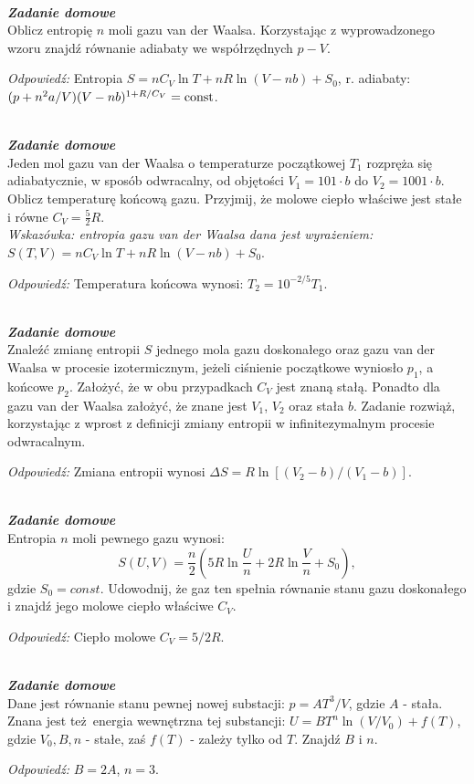 \documentclass[11pt,a4paper]{article}
\newcounter{zaddom}\newcommand{\zaddom}[1][]{\addtocounter{zaddom}{1} ~\\  {\bf \emph{Zadanie domowe \arabic{zaddom} #1 }} \\}
\begin{document}
\pagebreak
\zaddom
Oblicz entropię $n$ moli gazu van der Waalsa. Korzystając z wyprowadzonego
wzoru znajdź równanie adiabaty we współrzędnych $p - V$.

\vspace{5mm}
{\em Odpowiedź:} Entropia $S = n C_V \ln T + nR \ln (V - nb) + S_0$, r. adiabaty: $(p + n^2 a/ V)(V-nb)^{1+R/C_V} = {\rm const}$.


\zaddom
Jeden mol gazu van der Waalsa o temperaturze początkowej $T_1$ rozpręża się
adiabatycznie, w sposób odwracalny, od objętości $V_1 = 101\cdot b$ do
$V_2 = 1001\cdot b$. Oblicz temperaturę końcową gazu. Przyjmij, że
molowe ciepło właściwe jest stałe i równe $C_V=\frac{5}{2}R$.\\[3mm]
{\em Wskazówka: entropia gazu van der Waalsa dana jest wyrażeniem:\\
$\displaystyle S(T,V) = n C_V \ln{T} + n R \ln{(V-nb)} + S_0.$ }

\vspace{5mm}
{\em Odpowiedź:} Temperatura końcowa wynosi: $T_2 = 10^{-2/5} T_1$.  

\zaddom
Znaleźć zmianę entropii $S$ jednego mola gazu doskonałego oraz gazu van der Waalsa w procesie 
izotermicznym, jeżeli ciśnienie początkowe wyniosło $p_1$, a końcowe $p_2$. 
Założyć, że w obu przypadkach $C_V$ jest znaną stałą.
Ponadto dla gazu van der Waalsa założyć, że znane jest $V_1$, $V_2$ oraz stała $b$.
Zadanie rozwiąż, korzystając z wprost z definicji zmiany entropii 
w infinitezymalnym procesie odwracalnym. 

\vspace{5mm}
{\em Odpowiedź:} Zmiana entropii wynosi $\Delta S =  R \ln[ (V_2 - b)/(V_1 - b)]$. 

\zaddom
Entropia $n$ moli pewnego gazu wynosi:
\[ S(U,V) = \frac{n}{2}\left( 5 R \ln{\frac{U}{n}} + 2 R \ln{\frac{V}{n}} + S_0 \right)\!,\]
gdzie $S_0=const$. Udowodnij, że gaz ten spełnia równanie stanu gazu doskonałego
i znajdź jego molowe ciepło właściwe $C_V$.

\vspace{5mm}
{\em Odpowiedź:} Ciepło molowe $C_V = 5/2 R$. 


\zaddom
Dane jest równanie stanu pewnej nowej substacji: $p=A T^3 /V$, gdzie $A$ - stała. 
Znana jest też energia wewnętrzna tej substancji: $U= B T^n \ln(V/V_0)+ f(T)$,
gdzie $V_0, B, n$ - stałe, zaś $ f(T)$ - zależy tylko od $T$. Znajdź $B$ i $n$.

\vspace{5mm}
{\em Odpowiedź:} $B= 2A$, $n=3$.
\end{document}
